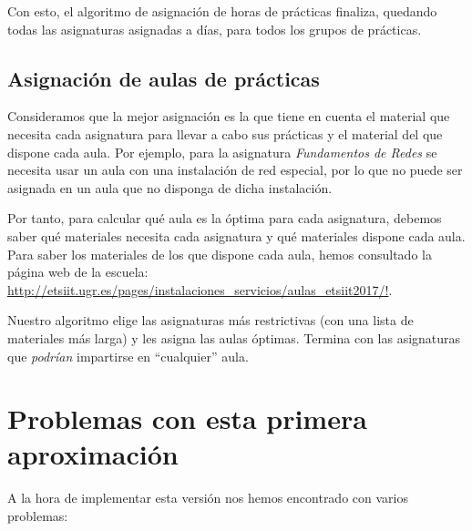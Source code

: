 Con esto, el algoritmo de asignación de horas de prácticas finaliza, quedando todas las asignaturas asignadas a días, para todos los grupos de prácticas.

\subsection{Asignación de aulas de prácticas}
Consideramos que la mejor asignación es la que tiene en cuenta el material que necesita cada asignatura para llevar a cabo sus prácticas y el material del que dispone cada aula. Por ejemplo, para la asignatura \textit{Fundamentos de Redes} se necesita usar un aula con una instalación de red especial, por lo que no puede ser asignada en un aula que no disponga de dicha instalación. 

Por tanto, para calcular qué aula es la óptima para cada asignatura, debemos saber qué materiales necesita cada asignatura y qué materiales dispone cada aula. Para saber los materiales de los que dispone cada aula, hemos consultado la página web de la escuela: \url{http://etsiit.ugr.es/pages/instalaciones_servicios/aulas_etsiit2017/!}.

Nuestro algoritmo elige las asignaturas más restrictivas (con una lista de materiales más larga) y les asigna las aulas óptimas. Termina con las asignaturas que \textit{podrían} impartirse en ``cualquier'' aula.

\section{Problemas con esta primera aproximación}
A la hora de implementar esta versión nos hemos encontrado con varios problemas:

